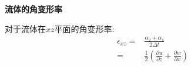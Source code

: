 \textbf{流体的角变形率}

对于流体在$xz$平面的角变形率:
\begin{align}
\epsilon_{xz}=&\frac{\alpha_2+\alpha_1}{2\Delta t}\nonumber\\
=&\frac{1}{2}(\frac{\partial u}{\partial z}+\frac{\partial w}{\partial x})
\end{align}
